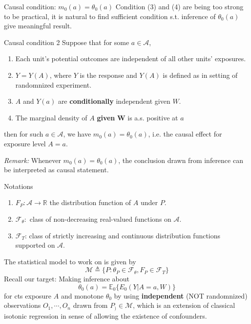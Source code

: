 \documentclass{beamer}
\newcommand{\defn}{\triangleq}
\newcommand{\E}{\mathbb{E}}
\newcommand{\bo}[1]{\boldsymbol{#1}}
\newcommand{\R}{\mathbb{R}}
\newcommand{\F}{\mathscr{F}}
\begin{document}
\begin{frame}{Causal condition: $m_0(a)=\theta_0(a)$}
Condition (3) and (4) are being too strong to be practical, it is natural to find sufficient condition s.t. inference of $\theta_0(a)$ give meaningful result.
	\begin{block}{Causal condition 2}
		Suppose that for some $a\in \mathcal{A}$,
		\begin{enumerate}
			\item Each unit's potential outcomes are independent of all other units' exposures.

			\item $Y=Y(A)$, where $Y$ is the response and $Y(A)$ is defined as in setting of randomnized experiment.

			\item $A$ and $Y(a)$ are \textbf{conditionally} independent given $W$.

			\item The marginal density of $A$ \textbf{given} $\bo{W}$ is a.s. positive at $a$
		\end{enumerate}
		then for such $a\in \mathcal{A}$, we have $m_0(a)=\theta_0(a)$, i.e. the causal effect for exposure level $A=a$.
	\end{block}
	\textit{
		Remark:
	} Whenever $m_0(a)=\theta_0(a)$, the conclusion drawn from inference can be interpreted as causal statement.
\end{frame}

\begin{frame}{Notations}
	\begin{enumerate}
		\item $F_P:\mathcal{A}\to\R$ the distribution function of $A$ under $P$.

		\item $\F_\theta:$ class of non-decreasing real-valued functions on $\mathcal{A}$.

		\item $\F_T$: class of strictly increasing and continuous distribution functions supported on $\mathcal{A}$.
	\end{enumerate}
	The statistical model to work on is given by
	$$
	\mathcal{M}\defn \big\{
	P:\theta_P\in\F_\theta,F_P\in\F_T
	\big\}
	$$
	Recall our target: Making inference about $$\theta_0(a)=\E_0\big\{E_0(Y|A=a,W) \big\}$$ for cts exposure $A$ and monotone $\theta_0$ by using \textbf{independent} (NOT randomnized) observations $O_1,\cdots,O_n$ drawn from $P_)\in\mathcal{M}$, which is an extension of classical isotonic regression in sense of allowing the existence of confounders.
\end{frame}
\end{document}
